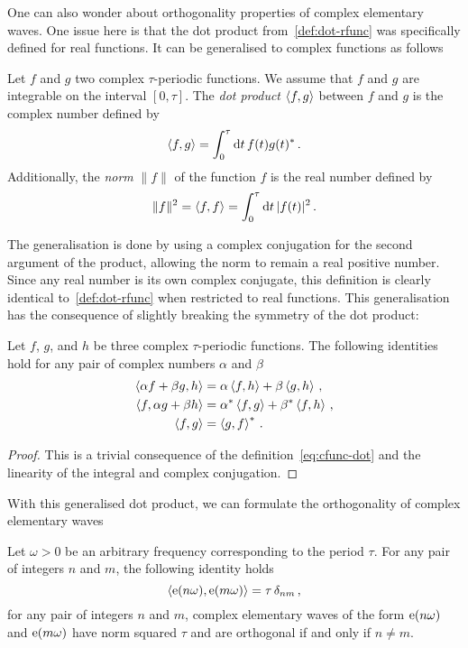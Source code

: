 One can also wonder about orthogonality properties of complex elementary waves. One issue
here is that the dot product from~\cref{def:dot-rfunc} was specifically defined for real
functions. It can be generalised to complex functions as follows
\begin{definition}
  Let $f$ and $g$ two complex $\tau$-periodic functions. We assume that $f$ and $g$ are
  integrable on the interval $[0,\tau]$. The \emph{dot product} $\braket{f,g}$ between $f$
  and $g$ is the complex number defined by
  \begin{equation}
    \braket{f,g}=\int_{0}^{\tau}\mathrm{d} t\, f(t)g(t)^*\,.\label{eq:cfunc-dot}
  \end{equation}
  Additionally, the \emph{norm} $\|f\|$ of the function $f$ is the real number defined by
  \begin{equation}
    \|f\|^2=\braket{f,f}=\int_{0}^{\tau}\mathrm{d} t\, |f(t)|^2\,.
  \end{equation}
\end{definition}
The generalisation is done by using a complex conjugation for the second argument of the
product, allowing the norm to remain a real positive number. Since any real number is its
own complex conjugate, this definition is clearly identical to~\cref{def:dot-rfunc} when
restricted to real functions. This generalisation has the consequence of slightly breaking
the symmetry of the dot product:
\begin{proposition}
  Let $f$, $g$, and $h$ be three complex $\tau$-periodic functions. The following
  identities hold for any pair of complex numbers $\alpha$ and $\beta$
  \begin{align}
    \braket{\alpha f+\beta g,h}&=\alpha\braket{f,h}+\beta\braket{g,h}\,,\\
    \braket{f,\alpha g+\beta h}&=\alpha^*\braket{f,g}+\beta^*\braket{f,h}\,,\\
    \braket{f,g}&=\braket{g,f}^*\,.
  \end{align}
\end{proposition}
\begin{proof}
  This is a trivial consequence of the definition~\cref{eq:cfunc-dot} and the linearity of
  the integral and complex conjugation.
\end{proof}
With this generalised dot product, we can formulate the orthogonality of complex
elementary waves
\begin{theorem}
  \label{thm:orth-complex}
  Let $\omega>0$ be an arbitrary frequency corresponding to the period $\tau$. For any
  pair of integers $n$ and $m$, the following identity holds
  \begin{equation}
    \braket{\operatorname{e}(n\omega),\operatorname{e}(m\omega)}=\tau\,\delta_{nm}\,,
  \end{equation}
  \ie for any pair of integers $n$ and $m$, complex elementary waves of the form
  $\operatorname{e}(n\omega)$ and $\operatorname{e}(m\omega)$ have norm squared $\tau$ and are orthogonal if and
  only if $n\neq m$.
\end{theorem}
